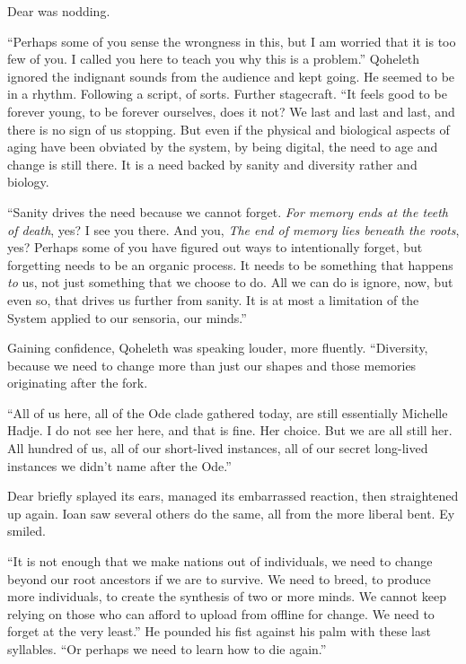 Dear was nodding.

``Perhaps some of you sense the wrongness in this, but I am worried that it is too few of you. I called you here to teach you why this is a problem.'' Qoheleth ignored the indignant sounds from the audience and kept going. He seemed to be in a rhythm. Following a script, of sorts. Further stagecraft. ``It feels good to be forever young, to be forever ourselves, does it not? We last and last and last, and there is no sign of us stopping. But even if the physical and biological aspects of aging have been obviated by the system, by being digital, the need to age and change is still there. It is a need backed by sanity and diversity rather and biology.

``Sanity drives the need because we cannot forget. \emph{For memory ends at the teeth of death}, yes? I see you there. And you, \emph{The end of memory lies beneath the roots}, yes? Perhaps some of you have figured out ways to intentionally forget, but forgetting needs to be an organic process. It needs to be something that happens \emph{to} us, not just something that we choose to do. All we can do is ignore, now, but even so, that drives us further from sanity. It is at most a limitation of the System applied to our sensoria, our minds.''

Gaining confidence, Qoheleth was speaking louder, more fluently. ``Diversity, because we need to change more than just our shapes and those memories originating after the fork.

``All of us here, all of the Ode clade gathered today, are still essentially Michelle Hadje. I do not see her here, and that is fine. Her choice. But we are all still her. All hundred of us, all of our short-lived instances, all of our secret long-lived instances we didn't name after the Ode.''

Dear briefly splayed its ears, managed its embarrassed reaction, then straightened up again. Ioan saw several others do the same, all from the more liberal bent. Ey smiled.

``It is not enough that we make nations out of individuals, we need to change beyond our root ancestors if we are to survive. We need to breed, to produce more individuals, to create the synthesis of two or more minds. We cannot keep relying on those who can afford to upload from offline for change. We need to forget at the very least.'' He pounded his fist against his palm with these last syllables. ``Or perhaps we need to learn how to die again.''

